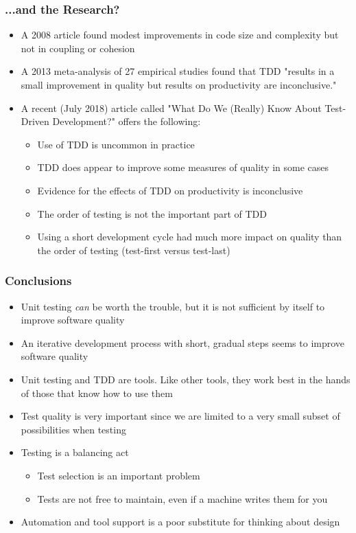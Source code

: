 \documentclass{beamer}
\begin{document}
\begin{frame}
\frametitle{...and the Research?}
\begin{itemize}
	\item A 2008 article \cite{doesTDDWork} found modest improvements in code size and complexity but not in coupling or cohesion
	\item A 2013 meta-analysis\cite{tddMeta} of 27 empirical studies found that TDD "results in a small improvement in quality but results on productivity are inconclusive."
	\item A recent (July 2018) article\cite{whatWeKnowTDD} called "What Do We (Really) Know About Test-Driven Development?" offers the following:
	\begin{itemize}
		\item Use of TDD is uncommon in practice
		\item TDD does appear to improve some measures of quality in some cases
		\item Evidence for the effects of TDD on productivity is inconclusive 
		\item The order of testing is not the important part of TDD
		\item Using a short development cycle had much more impact on quality than the order of testing (test-first versus test-last)
	\end{itemize}
\end{itemize}
\end{frame}

\begin{frame}
\frametitle{Conclusions}
\begin{itemize}
	\item Unit testing \textit{can} be worth the trouble, but it is not sufficient by itself to improve software quality
	\item An iterative development process with short, gradual steps seems to improve software quality
	\item Unit testing and TDD are tools. Like other tools, they work best in the hands of those that know how to use them
	\item Test quality is very important since we are limited to a very small subset of possibilities when testing
	\item Testing is a balancing act
	\begin{itemize}
		\item Test selection is an important problem
		\item Tests are not free to maintain, even if a machine writes them for you
	\end{itemize}
	\item Automation and tool support is a poor substitute for thinking about design
\end{itemize}
\end{frame}	
\end{document}
